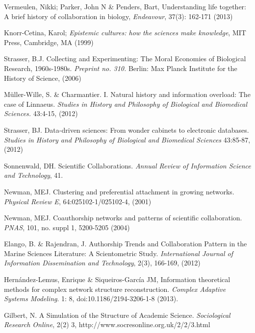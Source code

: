 \documentclass[11pt]{article}
\begin{document}
{%

\begin{thebibliography}{100}

 Vermeulen, Nikki; Parker, John N \& Penders,
  Bart, Understanding life together: A brief history of collaboration
  in biology, \textit{Endeavour}, 37(3): 162-171 (2013) 

 Knorr-Cetina, Karol; \textit{Epistemic
  cultures: how the sciences make knowledge}, MIT Press, Cambridge, MA
  (1999) 

 Strasser, B.J. Collecting and Experimenting:
  The Moral Economies of Biological Research, 1960s-1980s.
  \textit{Preprint no. 310.} Berlin: Max Planck Institute for the
  History of Science, (2006) 

 M\"{u}ller-Wille, S. \& Charmantier. I.  Natural
  history and information overload: The case of Linnaeus.
  \textit{Studies in History and Philosophy of Biological and
    Biomedical Sciences.} 43:4-15, (2012) 

 Strasser, BJ. Data-driven sciences: From
  wonder cabinets to electronic databases. \textit{Studies in History
    and Philosophy of Biological and Biomedical Sciences} 43:85-87,
  (2012)

 Sonnenwald, DH. Scientific Collaborations. \textit{Annual Review of Information Science and
  Technology}, 41.

 Newman, MEJ. Clustering and preferential
  attachment in growing networks. \textit{Physical Review E},
  64:025102-1/025102-4, (2001) 

 Newman, MEJ. Coauthorship networks and patterns
  of scientific collaboration. \textit{PNAS}, 101, no. suppl 1,
  5200-5205 (2004) 

 Elango, B. \& Rajendran, J. Authorship Trends and
  Collaboration Pattern in the Marine Sciences Literature: A
  Scientometric Study. \textit{International Journal of Information
    Dissemination and Technology}, 2(3), 166-169, (2012)
  
  
 Hern\'andez-Lemus, Enrique \&
  Siqueiros-Garc\'ia JM, Information theoretical methods for complex
  network structure reconstruction. \textit{Complex Adaptive Systems
    Modeling}. 1: 8, doi:10.1186/2194-3206-1-8 (2013).

 Gilbert, N. A Simulation of the Structure of
  Academic Science. \textit{Sociological Research Online}, 2(2) 3,
  http://www.socresonline.org.uk/2/2/3.html 
  

\end{thebibliography}}
\end{document}
